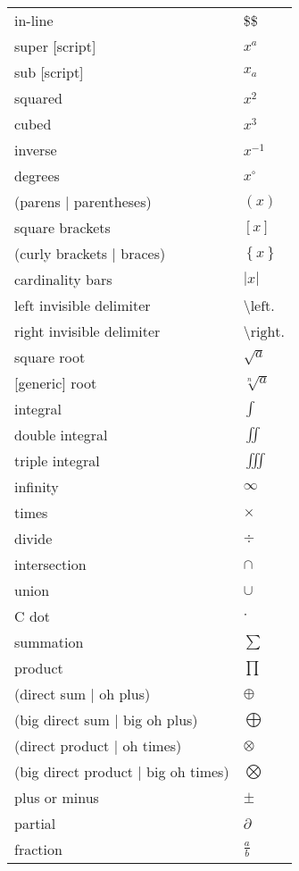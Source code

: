 \documentclass[12pt, a4paper]{article}
\begin{document}
\begin{longtable}{ll}
in-line & \$\$ \\
super [script] & $x^{a}$ \\
sub [script] & $x_{a}$ \\
squared & $x^{2} $ \\
cubed & $x^{3} $ \\
inverse & $x^{-1} $ \\
degrees & $x^{\circ}$ \\
(parens | parentheses) & $\left( x \right)$ \\
square brackets & $\left[ x \right] $ \\
(curly brackets | braces) & $\left\{ x \right\} $ \\
cardinality bars & $\left| x \right|$ \\
left invisible delimiter & \textbackslash $\text{left.}$ \\
right invisible delimiter & \textbackslash $\text{right.}$ \\
square root & $\sqrt{a}$ \\
{[generic]} root & $\sqrt[n]{a}$ \\
integral & $\int$ \\
double integral & $\iint$ \\
triple integral & $\iiint$ \\
infinity & $\infty$ \\
times & $\times$ \\
divide & $\div$ \\
intersection & $\cap$ \\
union & $\cup$ \\
C dot & $\cdot$ \\
summation & $\sum$ \\
product & $\prod$ \\
(direct sum | oh plus) & $\oplus$ \\
(big direct sum | big oh plus) & $\bigoplus$ \\
(direct product | oh times) & $\otimes$ \\
(big direct product | big oh times) & $\bigotimes$ \\
plus or minus & $\pm$ \\
partial & $\partial$ \\
fraction & $\frac{a}{b}$ \\

\end{longtable}
\end{document}
